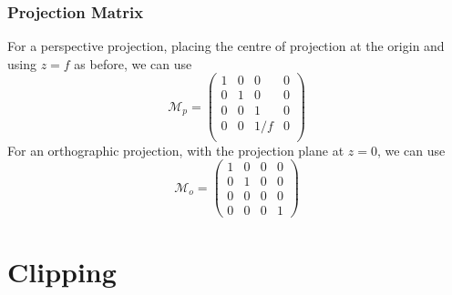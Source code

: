 \documentclass[twocolumn,landscape,10pt]{article}
\theoremstyle{definition}
\begin{document}
\subsubsection{Projection Matrix}

For a perspective projection, placing the centre of projection at the origin and
using $z=f$ as before, we can use
\[
    \mathcal{M}_p=
    \begin{pmatrix}
        1 & 0 & 0 & 0 \\
        0 & 1 & 0 & 0 \\
        0 & 0 & 1 & 0 \\
        0 & 0 & 1/f & 0 \\
    \end{pmatrix} 
\]
For an orthographic projection, with the projection plane at $z=0$, we can use
\[
    \mathcal{M}_o=
    \begin{pmatrix}
        1 & 0 & 0 & 0 \\
        0 & 1 & 0 & 0 \\
        0 & 0 & 0 & 0 \\
        0 & 0 & 0 & 1 
    \end{pmatrix} 
\]

\section{Clipping}
\end{document}
